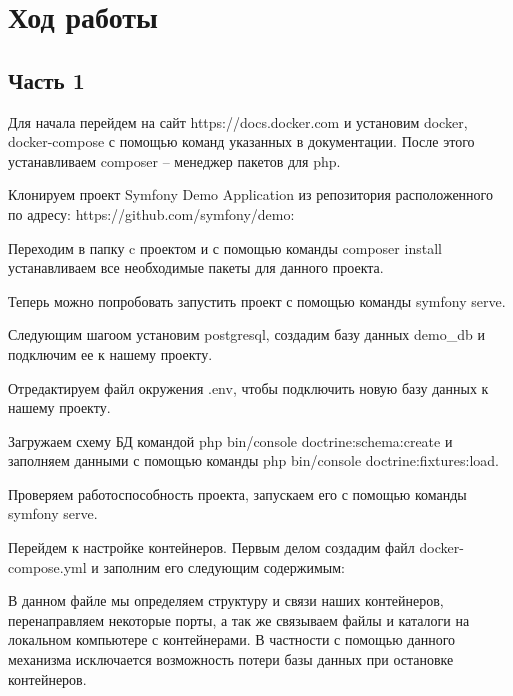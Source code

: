 \section{Ход работы}
\subsection{Часть 1}

Для начала перейдем на сайт https://docs.docker.com и установим docker, docker-compose с помощью команд указанных в документации. После этого устанавливаем composer -- менеджер пакетов для php. 

Клонируем проект Symfony Demo Application из репозитория расположенного по адресу: https://github.com/symfony/demo:


Переходим в папку c проектом и с помощью команды composer install устанавливаем все необходимые пакеты для данного проекта.


Теперь можно попробовать запустить проект с помощью команды symfony serve.


Следующим шагоом установим postgresql, создадим базу данных demo\_db и подключим ее к нашему проекту.


Отредактируем файл окружения .env, чтобы подключить новую базу данных к нашему проекту.


Загружаем схему БД командой php bin/console doctrine:schema:create и заполняем данными с помощью команды php bin/console doctrine:fixtures:load.

Проверяем работоспособность проекта, запускаем его с помощью команды symfony serve.


\newpage
Перейдем к настройке контейнеров. Первым делом создадим файл docker-compose.yml и заполним его следующим содержимым:



В данном файле мы определяем структуру и связи наших контейнеров, перенаправляем некоторые порты, а так же связываем файлы и каталоги на локальном компьютере с контейнерами. В частности с помощью данного механизма исключается возможность потери базы данных при остановке контейнеров.


